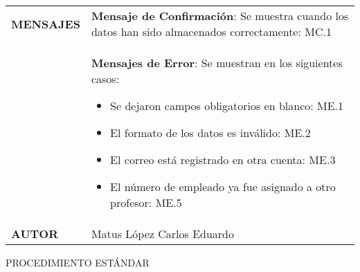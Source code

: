 \newpage
\begin{longtable}{ | p{6cm} | p{10cm} |}
\hline
\textbf{MENSAJES} & \textbf{Mensaje de Confirmación}: Se muestra cuando los datos han sido almacenados correctamente: MC.1\\&\textbf{Mensajes de Error}: Se muestran en los siguientes casos:\begin{itemize}
    \item Se dejaron campos obligatorios en blanco: ME.1
    \item El formato de los datos es inválido: ME.2
    \item El correo está registrado en otra cuenta: ME.3
    \item El número de empleado ya fue asignado a otro profesor: ME.5
\end{itemize}\\
\hline
\textbf{AUTOR} & Matus López Carlos Eduardo\\
\hline
\end{longtable}
\vspace*{1cm}
\noindent
\Large{PROCEDIMIENTO ESTÁNDAR}
\large{}
